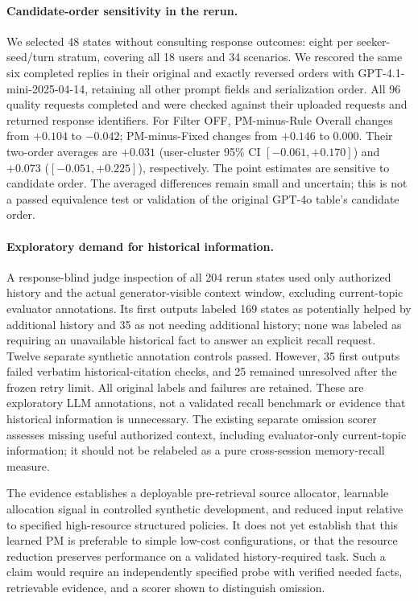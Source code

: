 \paragraph{Candidate-order sensitivity in the rerun.}
We selected 48 states without consulting response outcomes: eight per
seeker-seed/turn stratum, covering all 18 users and 34 scenarios. We rescored
the same six completed replies in their original and exactly reversed
orders with GPT-4.1-mini-2025-04-14, retaining all other prompt fields and
serialization order. All 96 quality requests completed and were checked
against their uploaded requests and returned response identifiers.
For Filter OFF, PM-minus-Rule Overall changes from $+0.104$ to $-0.042$;
PM-minus-Fixed changes from $+0.146$ to $0.000$.
Their two-order averages are $+0.031$ (user-cluster 95\% CI
$[-0.061,+0.170]$) and $+0.073$ ($[-0.051,+0.225]$), respectively.
The point estimates are sensitive to candidate order. The averaged
differences remain small and uncertain; this is not a passed equivalence
test or validation of the original GPT-4o table's candidate order.

\paragraph{Exploratory demand for historical information.}
A response-blind judge inspection of all 204 rerun states used only
authorized history and the actual generator-visible context window,
excluding current-topic evaluator annotations. Its first outputs labeled
169 states as potentially helped by additional history and 35 as not
needing additional history; none was labeled as requiring an unavailable
historical fact to answer an explicit recall request. Twelve separate
synthetic annotation controls passed. However, 35 first outputs failed
verbatim historical-citation checks, and 25 remained unresolved after
the frozen retry limit. All original labels and failures are retained.
These are exploratory LLM annotations, not a validated recall benchmark
or evidence that historical information is unnecessary.
The existing separate omission scorer assesses missing useful authorized
context, including evaluator-only current-topic information; it should
not be relabeled as a pure cross-session memory-recall measure.

The evidence establishes a deployable pre-retrieval source allocator,
learnable allocation signal in controlled synthetic development, and
reduced input relative to specified high-resource structured policies.
It does not yet establish that this learned PM is preferable to simple
low-cost configurations, or that the resource reduction preserves
performance on a validated history-required task. Such a claim would
require an independently specified probe with verified needed facts,
retrievable evidence, and a scorer shown to distinguish omission.
